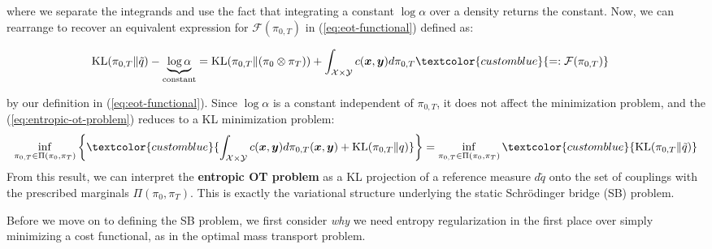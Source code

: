 \documentclass{article}
\newcommand{\bluetext}[1]{\textcolor{customblue}{#1}}
\begin{document}
where we separate the integrands and use the fact that integrating a constant $\log \alpha$ over a density returns the constant. Now, we can rearrange to recover an equivalent expression for $\mathcal{F}(\pi_{0,T})$ in (\ref{eq:eot-functional}) defined as:
\begin{small}
\begin{align}
    \text{KL}(\pi_{0,T}\|\tilde{q})-\underbrace{\log \alpha}_{\text{constant}}&=\text{KL}(\pi_{0,T}\|(\pi_0\otimes\pi_T))+\int_{\mathcal{X}\times \mathcal{Y}}c(\boldsymbol{x}, \boldsymbol{y})d\pi_{0,T}\bluetext{=:\mathcal{F}(\pi_{0,T})}
\end{align}
\end{small}
by our definition in (\ref{eq:eot-functional}). Since $\log\alpha$ is a constant independent of $\pi_{0,T}$, it does not affect the minimization problem, and the (\ref{eq:entropic-ot-problem}) reduces to a KL minimization problem:
\begin{align}
    \inf_{\pi_{0,T}\in \Pi(\pi_0, \pi_T)}\left\{\bluetext{\int_{\mathcal{X}\times \mathcal{Y}}c(\boldsymbol{x},\boldsymbol{y})d\pi_{0,T}(\boldsymbol{x},\boldsymbol{y})+ \text{KL} (\pi_{0,T}\|q)}\right\}=\inf_{\pi_{0,T}\in \Pi(\pi_0, \pi_T)}\bluetext{\text{KL} (\pi_{0,T}\|\tilde{q})}\label{eq:entropic-ot-kl-proj}
\end{align}
From this result, we can interpret the \textbf{entropic OT problem} as a KL projection of a reference measure $d\tilde{q}$ onto the set of couplings with the prescribed marginals $\Pi(\pi_0, \pi_T)$. This is exactly the variational structure underlying the static Schrödinger bridge (SB) problem. 

Before we move on to defining the SB problem, we first consider \textit{why} we need entropy regularization in the first place over simply minimizing a cost functional, as in the optimal mass transport problem. 
\end{document}
